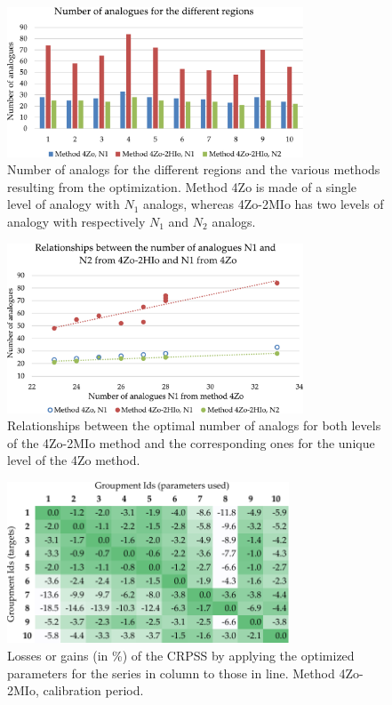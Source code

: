 \documentclass[review]{elsarticle}
\begin{document}
\begin{figure}[t]
	\centerline{\includegraphics[width=8.8cm]{figures/fig11.pdf}}
	\caption{Number of analogs for the different regions and the various methods resulting from the optimization. Method 4Zo is made of a single level of analogy with $N_{1}$ analogs, whereas 4Zo-2MIo has two levels of analogy with respectively $N_{1}$ and $N_{2}$ analogs.}
	\label{fig:figure_nb_analogs}
\end{figure}

\begin{figure}[t]
	\centerline{\includegraphics[width=8.8cm]{figures/fig12.pdf}}
	\caption{Relationships between the optimal number of analogs for both levels of the 4Zo-2MIo method and the corresponding ones for the unique level of the 4Zo method.}
	\label{fig:figure_nb_analogs_relationships}
\end{figure}

\begin{figure}[t]
	\centerline{\includegraphics[width=8.4cm]{figures/fig13.pdf}}
	\caption{Losses or gains (in \%) of the CRPSS by applying the optimized parameters for the series in column to those in line. Method 4Zo-2MIo, calibration period.}
	\label{fig:crossing_4Zo-2MIo_calib}
\end{figure}
\end{document}
